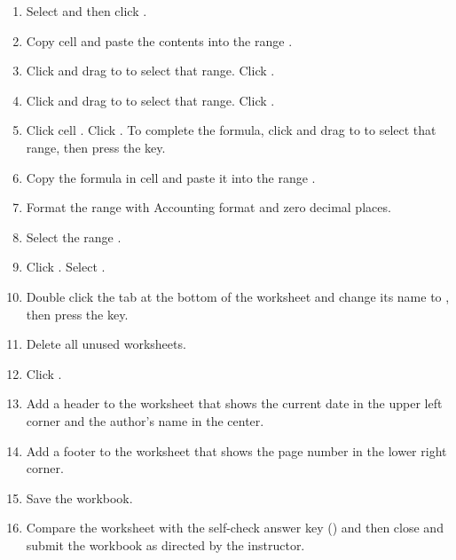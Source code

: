 \begin{enumerate}[resume]
	\item Select  and then click . 
	\item Copy cell  and paste the contents into the range .
	\item Click  and drag to  to select that range. Click .
	\item Click  and drag to  to select that range. Click .
	\item Click cell . Click . To complete the formula, click  and drag to  to select that range, then press the  key.
	\item Copy the formula in cell  and paste it into the range .
	\item Format the range  with Accounting format and zero decimal places.
	\item Select the range .
	\item Click . Select .
	\item Double click the  tab at the bottom of the worksheet and change its name to , then press the  key. 
	\item Delete all unused worksheets.
	\item Click .
	\item Add a header to the  worksheet that shows the current date in the upper left corner and the author's name in the center.
	\item Add a footer to the  worksheet that shows the page number in the lower right corner. 
	\item Save the  workbook.
	\item Compare the worksheet with the self-check answer key () and then close and submit the  workbook as directed by the instructor.
\end{enumerate}

